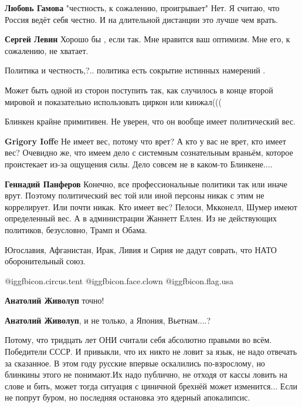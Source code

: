 \begin{itemize}
\begin{itemize} %
\textbf{Любовь Гамова} "честность, к сожалению, проигрывает"
Нет. Я считаю, что Россия ведёт себя честно. И на длительной дистанции это лучше чем врать.

\textbf{Сергей Левин} Хорошо бы , если так. Мне нравится ваш оптимизм. Мне его, к сожалению, не хватает.

Политика и честность,?.. политика есть сокрытие истинных намерений .
\end{itemize} %

Может быть одной из сторон поступить так, как случилось в конце второй мировой и показательно использовать циркон или кинжал(((

Блинкен крайне примитивен. Не уверен, что он вообще имеет политический вес.

\begin{itemize} %
\textbf{Grigory Ioffe} Не имеет вес, потому что врет? А кто у вас не врет, кто имеет вес? Очевидно же, что имеем дело с системным сознательным враньём, которое проистекает из-за ощущения силы. Дело совсем не в каком-то Блинкене....

\textbf{Геннадий Панферов} Конечно, все профессиональные политики так или иначе врут. Поэтому политический вес той или иной персоны никак с этим не коррелирует. Или почти никак. Кто имеет вес? Пелоси, Мкконелл, Шумер имеют определенный вес. А в администрации Жаннетт Еллен. Из не действующих политиков, безусловно, Трамп и Обама.
\end{itemize} %

Югославия, Афганистан, Ирак, Ливия и Сирия не дадут соврать, что НАТО оборонительный союз.

 @igg{fbicon.circus.tent}  @igg{fbicon.face.clown} @igg{fbicon.flag.usa}

\begin{itemize} %
\textbf{Анатолий Живолуп} точно!

\textbf{Анатолий Живолуп}, и не только, а Япония, Вьетнам....?
\end{itemize} %


Потому, что тридцать лет ОНИ считали себя абсолютно правыми во всём. Победители
СССР. И привыкли, что их никто не ловит за язык, не надо отвечать за
сказанное. В этом году русские впервые оскалились по-взрослому, но блинкины
этого не понимают.Их надо публично, не отходя от кассы ловить на слове и бить,
может тогда ситуация с циничной брехнёй может изменится... Если не попрут
буром, но последняя остановка это ядерный апокалипсис.


\end{itemize}
